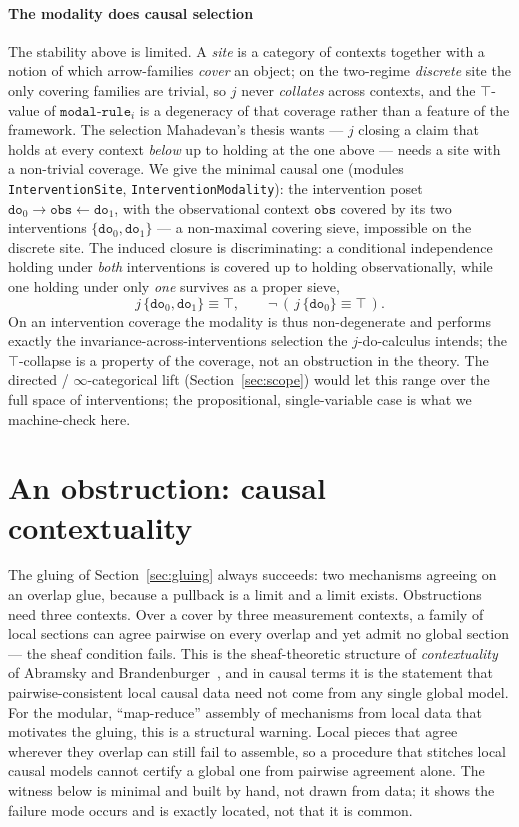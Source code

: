 \documentclass{lmcs}
\begin{document}
\paragraph{The modality does causal selection}
The stability above is limited. A \emph{site} is a category of contexts together with a notion of which arrow-families \emph{cover} an object; on the two-regime \emph{discrete} site the only covering families are trivial, so $j$ never \emph{collates} across contexts, and the $\top$-value of $\mathtt{modal\text{-}rule}_i$ is a degeneracy of that coverage rather than a feature of the framework.
The selection Mahadevan's thesis wants --- $j$ closing a claim that holds at every context \emph{below} up to holding at the one above --- needs a site with a non-trivial coverage.
We give the minimal causal one (modules \texttt{InterventionSite}, \texttt{InterventionModality}): the intervention poset $\mathtt{do}_0 \to \mathtt{obs} \leftarrow \mathtt{do}_1$, with the observational context $\mathtt{obs}$ covered by its two interventions $\{\mathtt{do}_0, \mathtt{do}_1\}$ --- a non-maximal covering sieve, impossible on the discrete site.
The induced closure is discriminating: a conditional independence holding under \emph{both} interventions is covered up to holding observationally, while one holding under only \emph{one} survives as a proper sieve,
\[ j\,\{\mathtt{do}_0,\mathtt{do}_1\} \equiv \top, \qquad \neg\,(\,j\,\{\mathtt{do}_0\} \equiv \top\,). \]
On an intervention coverage the modality is thus non-degenerate and performs exactly the invariance-across-interventions selection the $j$-do-calculus intends; the $\top$-collapse is a property of the coverage, not an obstruction in the theory.
The directed / $\infty$-categorical lift (Section~\ref{sec:scope}) would let this range over the full space of interventions; the propositional, single-variable case is what we machine-check here.

\section{An obstruction: causal contextuality}\label{sec:obstruction}

The gluing of Section~\ref{sec:gluing} always succeeds: two mechanisms agreeing on an overlap glue, because a pullback is a limit and a limit exists.
Obstructions need three contexts.
Over a cover by three measurement contexts, a family of local sections can agree pairwise on every overlap and yet admit no global section --- the sheaf condition fails.
This is the sheaf-theoretic structure of \emph{contextuality} of Abramsky and Brandenburger~\cite{abramsky-brandenburger-2011}, and in causal terms it is the statement that pairwise-consistent local causal data need not come from any single global model.
For the modular, ``map-reduce'' assembly of mechanisms from local data that motivates the gluing, this is a structural warning. Local pieces that agree wherever they overlap can still fail to assemble, so a procedure that stitches local causal models cannot certify a global one from pairwise agreement alone.
The witness below is minimal and built by hand, not drawn from data; it shows the failure mode occurs and is exactly located, not that it is common.
\end{document}
